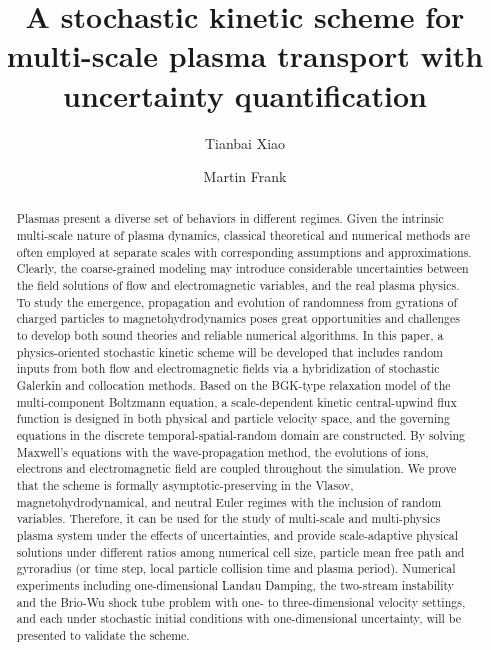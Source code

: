\documentclass[preprint,3p,12pt,sort&compress]{elsarticle}
\begin{document}
\title{A stochastic kinetic scheme for multi-scale plasma transport with uncertainty quantification}

\author[KIT]{Tianbai Xiao}

\author[KIT]{Martin Frank}

\address[KIT]{Karlsruhe Institute of Technology, Karlsruhe, Germany}


\begin{abstract}

Plasmas present a diverse set of behaviors in different regimes. Given the intrinsic multi-scale nature of plasma dynamics, classical theoretical and numerical methods are often employed at separate scales with corresponding assumptions and approximations. Clearly, the coarse-grained modeling may introduce considerable uncertainties between the field solutions of flow and electromagnetic variables, and the real plasma physics. 
To study the emergence, propagation and evolution of randomness from gyrations of charged particles to magnetohydrodynamics poses great opportunities and challenges to develop both sound theories and reliable numerical algorithms. 
In this paper, a physics-oriented stochastic kinetic scheme will be developed that includes random inputs from both flow and electromagnetic fields via a hybridization of stochastic Galerkin and collocation methods. 
Based on the BGK-type relaxation model of the multi-component Boltzmann equation, a scale-dependent kinetic central-upwind flux function is designed in both physical and particle velocity space, and the governing equations in the discrete temporal-spatial-random domain are constructed.
By solving Maxwell's equations with the wave-propagation method, the evolutions of ions, electrons and electromagnetic field are coupled throughout the simulation.
We prove that the scheme is formally asymptotic-preserving in the Vlasov, magnetohydrodynamical, and neutral Euler regimes with the inclusion of random variables.
Therefore, it can be used for the study of multi-scale and multi-physics plasma system under the effects of uncertainties,
and provide scale-adaptive physical solutions under different ratios among numerical cell size, particle mean free path and gyroradius (or time step, local particle collision time and plasma period).
Numerical experiments including one-dimensional Landau Damping, the two-stream instability and the Brio-Wu shock tube problem with one- to three-dimensional velocity settings, and each under stochastic initial conditions with one-dimensional uncertainty, will be presented to validate the scheme. 

\end{abstract}
\end{document}

